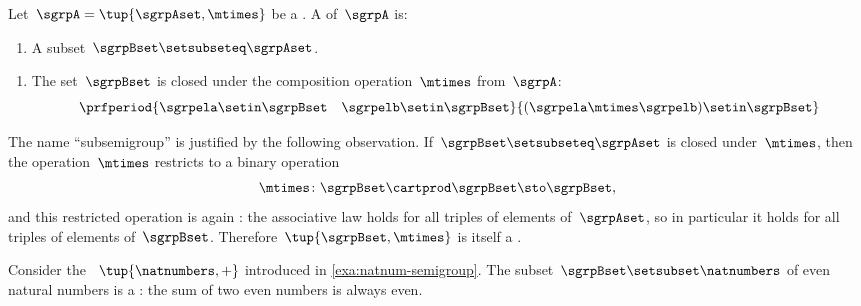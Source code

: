 \begin{ctdefinition}[Subsemigroup]\label{def:subsemigroup}
    Let~$\sgrpA = \tup{\sgrpAset, \mtimes}$ be a .
    A  of~$\sgrpA$ is:

    \constit

    \begin{enumerate}
        \item A subset~$\sgrpBset \setsubseteq \sgrpAset$.
    \end{enumerate}

    \condit

    \begin{enumerate}
        \item The set~$\sgrpBset$ is closed under the composition operation~$\mtimes$ from~$\sgrpA$:
              \begin{equation}\label{eq:subsemigroup-closure}
                  \prfperiod{
                      \sgrpela \setin \sgrpBset \quad \sgrpelb \setin \sgrpBset
                  }{
                      (\sgrpela \mtimes \sgrpelb) \setin \sgrpBset
                  }
              \end{equation}
    \end{enumerate}
\end{ctdefinition}

\begin{remark}
    \label{rem:subsemigroup-is-semigroup}
    The name ``subsemigroup'' is justified by the following observation.
    If~$\sgrpBset \setsubseteq \sgrpAset$ is closed under~$\mtimes$, then the operation~$\mtimes$ restricts to a binary operation
    \begin{equation}
        \mtimes \colon \sgrpBset \cartprod \sgrpBset \sto \sgrpBset,
    \end{equation}
    and this restricted operation is again : the associative law holds for all triples of elements of~$\sgrpAset$, so in particular it holds for all triples of elements of~$\sgrpBset$.
    Therefore~$\tup{\sgrpBset, \mtimes}$ is itself a .
\end{remark}

\begin{example}
    \label{exa:evennum-subsemigroup}
    Consider the ~$\tup{\natnumbers,+}$ introduced in \cref{exa:natnum-semigroup}.
    The subset~$\sgrpBset \setsubset \natnumbers$ of even natural numbers is a : the sum of two even numbers is always even.
\end{example}

